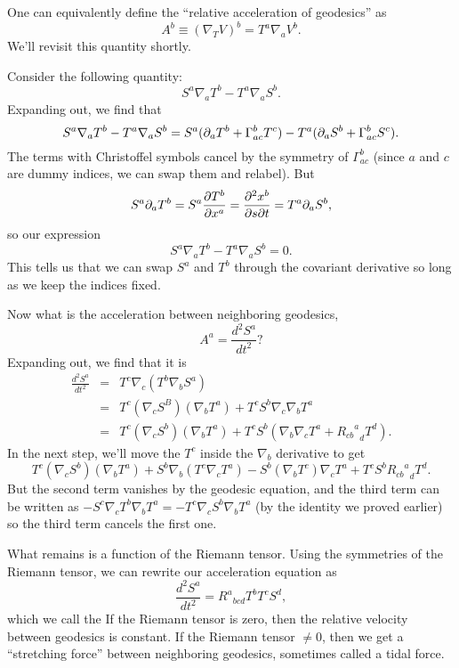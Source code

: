 One can equivalently define the ``relative acceleration of geodesics'' as
$$A^b \equiv (\nabla_T V)^b = T^a \nabla_a V^b.$$ We'll revisit this quantity shortly.

\begin{lem}
Consider the following quantity:
$$S^a \nabla_a T^b-T^a \nabla_a S^b.$$ 
Expanding out, we find that $$S^a\nabla_a T^b- T^a \nabla_a S^b= S^a (\partial_a T^b +\Gamma^b_{ac} T^c) - T^a (\partial_a S^b +\Gamma^b_{ac} S^c).$$
The terms with Christoffel symbols cancel by the symmetry of $\Gamma^b_{ac}$ (since $a$ and $c$ are dummy indices, we can swap them and relabel). But $$S^a \partial_a T^b = S^a \frac{\partial T^b}{\partial x^a} = \frac{\partial^2 x^b}{\partial s\partial t} = T^a \partial_a S^b,$$
so our expression
$$S^a \nabla_a T^b-T^a \nabla_a S^b=0.$$
This tells us that we can swap $S^a$ and $T^b$ through the covariant derivative so long as we keep the indices fixed.
\end{lem}

Now what is the acceleration between neighboring geodesics,
$$A^a =\frac{d^2S^a}{dt^2}?$$
Expanding out, we find that it is
\begin{eqnarray*}
\frac{d^2S^a}{dt^2}&=&T^c \nabla_c(T^b \nabla_b S^a)\\
&=&T^c (\nabla_c S^B)(\nabla_b T^a)+T^c S^b \nabla_c \nabla_b T^a\\
&=& T^c(\nabla_c S^b)(\nabla_b T^a)+T^c S^b(\nabla_b \nabla_c T^a +{{R_{cb}}^a}_d T^d).
\end{eqnarray*}
In the next step, we'll move the $T^c$ inside the $\nabla_b$ derivative to get
$$T^c(\nabla_c S^b)(\nabla_b T^a)+S^b\nabla_b(T^c \nabla_c T^a) - S^b(\nabla_b T^c) \nabla_c T^a+T^c S^b{{R_{cb}}^a}_d T^d.$$
But the second term vanishes by the geodesic equation, and the third term can be written as
$-S^c \nabla_c T^b \nabla_b T^a = -T^c \nabla_c S^b \nabla_b T^a$ (by the identity we proved earlier) so the third term cancels the first one.

What remains is a function of the Riemann tensor. Using the symmetries of the Riemann tensor, we can rewrite our acceleration equation as
$$\frac{d^2S^a}{dt^2}={R^a}_{bcd} T^b T^c S^d,$$
which we call the  If the Riemann tensor is zero, then the relative velocity between geodesics is constant. If the Riemann tensor $\neq 0$, then we get a ``stretching force'' between neighboring geodesics, sometimes called a tidal force.